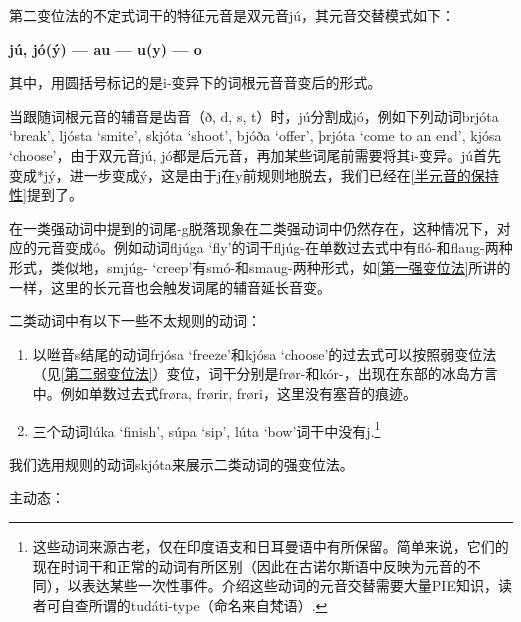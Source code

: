 第二变位法的不定式词干的特征元音是双元音jú，其元音交替模式如下：
\begin{center}
    \textbf{jú, jó(ý) --- au --- u(y) --- o}
\end{center}


其中，用圆括号标记的是i-变异下的词根元音音变后的形式。

当跟随词根元音的辅音是齿音（ð, d, s, t）时，jú分割成jó，例如下列动词brjóta `break‌', ljósta `smite‌', skjóta `shoot‌', bjóða `offer‌', þrjóta `come to an end‌', kjósa `choose‌'，由于双元音jú, jó都是后元音，再加某些词尾前需要将其i-变异。jú首先变成*jý，进一步变成ý，这是由于j在y前规则地脱去，我们已经在\ref{半元音的保持性}提到了。

在一类强动词中提到的词尾-g脱落现象在二类强动词中仍然存在，这种情况下，对应的元音变成ó。例如动词fljúga
`fly‌'的词干fljúg-在单数过去式中有fló-和flaug-两种形式，类似地，smjúg- `creep‌'有smó-和smaug-两种形式，如\ref{第一强变位法}所讲的一样，这里的长元音也会触发词尾的辅音延长音变。

二类动词中有以下一些不太规则的动词：

\begin{enumerate}
    \item
          以咝音s结尾的动词frjósa `freeze‌'和kjósa `choose‌'的过去式可以按照弱变位法（见\ref{第二弱变位法}）变位，词干分别是frør-和kór-，出现在东部的冰岛方言中。例如单数过去式frøra, frørir, frøri，这里没有塞音的痕迹。
    \item
          三个动词lúka `finish‌', súpa `sip‌', lúta `bow‌'词干中没有j.\footnote{这些动词来源古老，仅在印度语支和日耳曼语中有所保留。简单来说，它们的现在时词干和正常的动词有所区别（因此在古诺尔斯语中反映为元音的不同），以表达某些一次性事件。介绍这些动词的元音交替需要大量PIE知识，读者可自查所谓的tudáti-type（命名来自梵语）.}
\end{enumerate}

我们选用规则的动词skjóta来展示二类动词的强变位法。

主动态：

